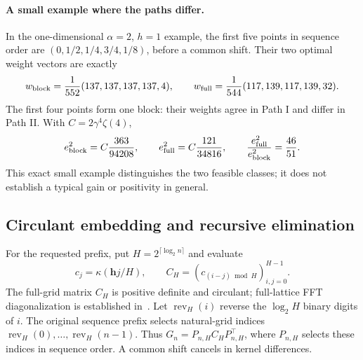 \documentclass[11pt]{article}
\newcommand{\bh}{\boldsymbol{h}}
\begin{document}
\paragraph{A small example where the paths differ.}
In the one-dimensional $\alpha=2$, $h=1$ example, the first five
points in sequence order are $(0,1/2,1/4,3/4,1/8)$, before a common shift.
Their two optimal weight vectors are exactly
\[
 w_{\rm block}=\frac1{552}(137,137,137,137,4),\qquad
 w_{\rm full}=\frac1{544}(117,139,117,139,32).
\]
The first four points form one block: their weights agree in Path I
and differ in Path II. With $C=2\gamma^4\zeta(4)$,
\[
 e_{\rm block}^2=C\frac{363}{94208},\qquad
 e_{\rm full}^2=C\frac{121}{34816},\qquad
 \frac{e_{\rm full}^2}{e_{\rm block}^2}=\frac{46}{51}.
\]
This exact small example distinguishes the two feasible classes;
it does not establish a typical gain or positivity in general.

\subsection{Circulant embedding and recursive elimination}
For the requested prefix, put $H=2^{\lceil\log_2n\rceil}$ and evaluate
\[
 c_j=\kappa(\bh j/H),\qquad
 C_H=(c_{(i-j)\bmod H})_{i,j=0}^{H-1}.
\]
The full-grid matrix $C_H$ is positive definite and circulant;
full-lattice FFT diagonalization is established
in~\cite{ZLH06,ZKH09,JH19,KKKNS22}.
Let $\operatorname{rev}_H(i)$ reverse the $\log_2H$ binary digits
of $i$. The original sequence prefix selects natural-grid indices
$\operatorname{rev}_H(0),\ldots,\operatorname{rev}_H(n-1)$.
Thus $G_n=P_{n,H}C_HP_{n,H}^\top$, where $P_{n,H}$ selects these
indices in sequence order. A common shift cancels in kernel differences.
\end{document}
